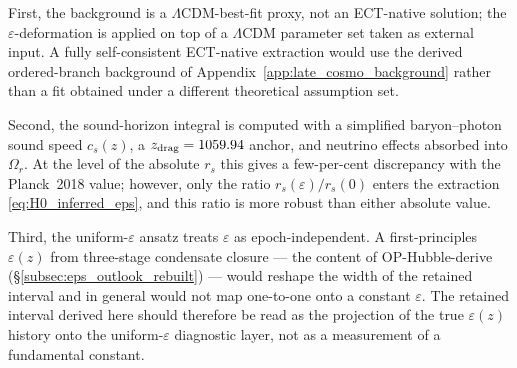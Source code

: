 First, the background is a $\Lambda$CDM-best-fit proxy, not an
ECT-native solution; the $\varepsilon$-deformation is applied on top
of a $\Lambda$CDM parameter set taken as external input. A fully
self-consistent ECT-native extraction would use the derived
ordered-branch background of Appendix~\ref{app:late_cosmo_background}
rather than a fit obtained under a different theoretical assumption
set.

Second, the sound-horizon integral is computed with a simplified
baryon--photon sound speed $c_s(z)$, a $z_{\rm drag} = 1059.94$
anchor, and neutrino effects absorbed into $\Omega_r$. At the level
of the absolute $r_s$ this gives a few-per-cent discrepancy with the
Planck~2018 value; however, only the ratio $r_s(\varepsilon)/r_s(0)$
enters the extraction \eqref{eq:H0_inferred_eps}, and this ratio is
more robust than either absolute value.

Third, the uniform-$\varepsilon$ ansatz treats $\varepsilon$ as
epoch-independent. A first-principles $\varepsilon(z)$ from three-stage
condensate closure --- the content of OP-Hubble-derive
(\S\ref{subsec:eps_outlook_rebuilt}) --- would reshape the width of
the retained interval and in general would not map one-to-one onto a
constant $\varepsilon$. The retained interval derived here should
therefore be read as the projection of the true $\varepsilon(z)$
history onto the uniform-$\varepsilon$ diagnostic layer, not as a
measurement of a fundamental constant.

